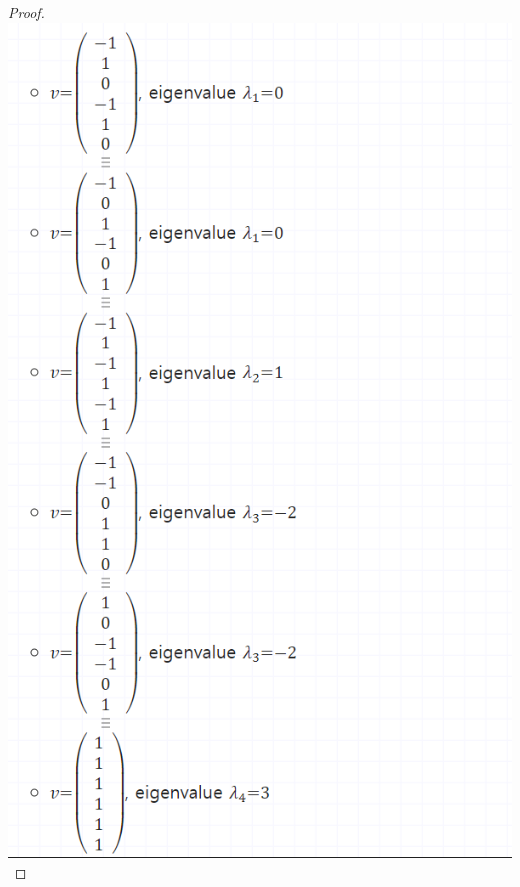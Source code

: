 \documentclass[a4paper, 12pt]{article}
\begin{document}
\begin{proof}
\includegraphics[width=1\linewidth]{image2.png} \\
\end{proof}
\end{document}
